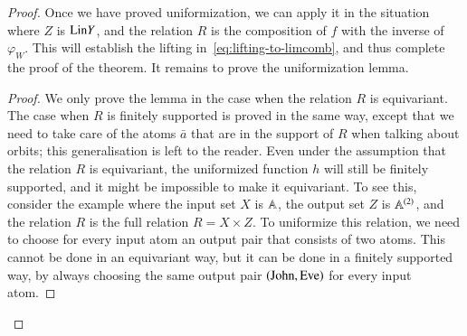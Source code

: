 \begin{proof}
    Once we have proved uniformization, we can apply it in the situation where $Z$ is $\mathrm{Lin} Y$, and the relation $R$ is the composition of $f$ with the inverse of $\varphi_W$.  This will establish the lifting in~\eqref{eq:lifting-to-limcomb}, and thus complete the proof of the theorem. It remains to prove the uniformization lemma.
    \begin{proof} 
        We only prove the lemma in the case when the relation $R$ is equivariant. The case when $R$ is finitely supported is proved in the same way, except that we need to take care of the atoms $\bar a$ that are in the support of $R$ when talking about orbits; this generalisation is left to the reader. Even under the assumption that the relation $R$ is equivariant, the uniformized function $h$ will still  be finitely supported, and it might be impossible to make it equivariant. To see this, consider the example where the input set $X$ is $\mathbb A$, the output set $Z$ is $\mathbb A^{(2)}$, and the relation $R$ is the full relation $R = X \times Z$. To uniformize this relation, we need to choose for every input atom an output pair that consists of  two atoms. This cannot be done in an equivariant way, but it can be done in a finitely supported way, by always choosing the same output pair $(\text{John},\text{Eve})$ for every input atom.


\end{proof}
\end{proof}
